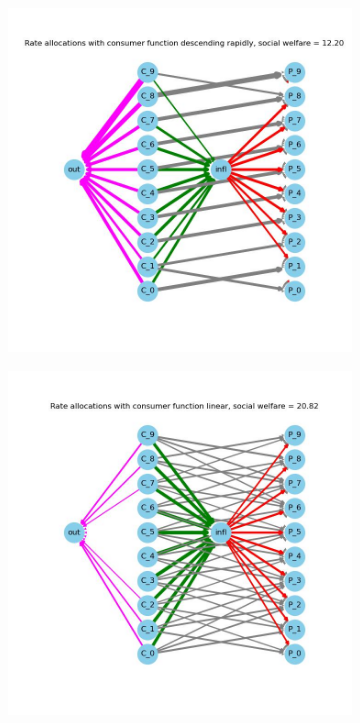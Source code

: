 \documentclass[11pt, letterpaper]{article}
\begin{document}
\begin{figure}[h]
    \begin{adjustbox}{max width=1.5\textwidth,center}
        \centering
        \begin{subfigure}[b]{0.4\textwidth}
          \includegraphics[width=\linewidth]{"figures/f/descending rapidly_allocs.jpg"}
        \end{subfigure}
        \begin{subfigure}[b]{0.4\textwidth}
          \includegraphics[width=\linewidth]{"figures/f/linear_allocs.jpg"}

\end{subfigure}
\end{adjustbox}
\end{figure}
\end{document}
